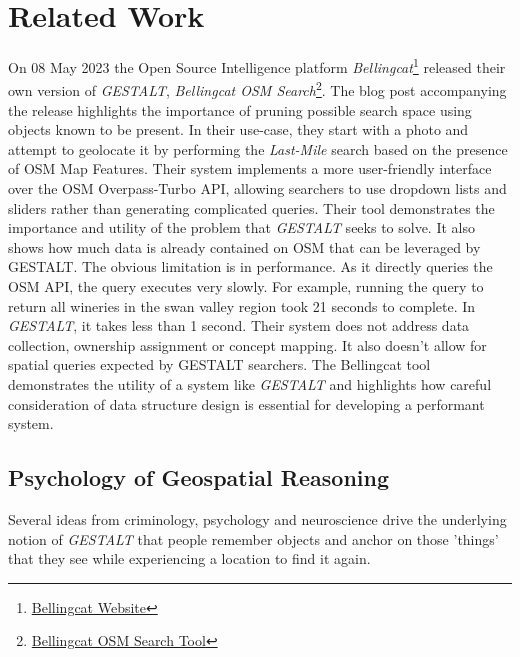 \section{Related Work}
\label{section:related}


On 08 May 2023 the Open Source Intelligence platform \textit{Bellingcat}\footnote{\href{https://www.bellingcat.com/about/who-we-are/}{Bellingcat Website}} released their own version of \textit{GESTALT}, \textit{Bellingcat OSM Search}\footnote{\href{https://osm-search.bellingcat.com/}{Bellingcat OSM Search Tool}}\cite{Williams2023}. 
The blog post accompanying the release highlights the importance of pruning possible search space using objects known to be present. 
In their use-case, they start with a photo and attempt to geolocate it by performing the \textit{Last-Mile} search based on the presence of OSM Map Features. Their system implements a more user-friendly interface over the OSM Overpass-Turbo API, allowing searchers to use dropdown lists and sliders rather than generating complicated queries. 
Their tool demonstrates the importance and utility of the problem that \textit{GESTALT} seeks to solve. It also shows how much data is already contained on OSM that can be leveraged by GESTALT. The obvious limitation is in performance. As it directly queries the OSM API, the query executes very slowly. For example, running the query to return all wineries in the swan valley region took 21 seconds to complete. In \textit{GESTALT}, it takes less than 1 second. 
Their system does not address data collection, ownership assignment or concept mapping. It also doesn't allow for spatial queries expected by GESTALT searchers. 
The Bellingcat tool demonstrates the utility of a system like \textit{GESTALT} and highlights how careful consideration of data structure design is essential for developing a performant system. 


\subsection{Psychology of Geospatial Reasoning}
Several ideas from criminology, psychology and neuroscience drive the underlying notion of \textit{GESTALT} that people remember objects and anchor on those 'things' that they see while experiencing a location to find it again. 

